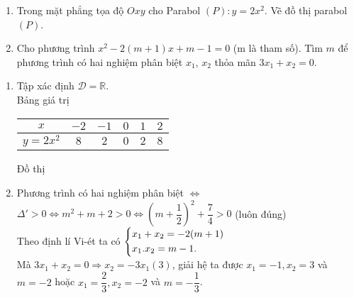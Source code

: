 \begin{ex}%
   \hfill
    \begin{enumerate}
        \item Trong mặt phẳng tọa độ $Oxy$ cho Parabol $(P):y=2x^2$. Vẽ đồ thị parabol $(P)$.
        \item Cho phương trình $x^2-2(m+1)x+m-1=0$ (m là tham số). Tìm $m$ để phương trình có hai nghiệm phân biệt $x_1$, $x_2$ thỏa mãn $3x_1+x_2=0$.
    \end{enumerate}
\loigiai
    {
    \begin{enumerate}
          \item Tập xác định $\mathscr{D} = \mathbb{R}$.\\
        Bảng giá trị \\
       \begin{center}
         \begin{tabular}{|c|c|c|c|c|c|}
        \hline 
        $x$ & $-2$ & $-1$ & $0$ & $1$ & $2$ \\ 
        \hline 
        $y = 2x^2$ & $8$ & $2$ & $0$ & $2$ & $8$ \\ 
        \hline 
        \end{tabular}
        \end{center} 
        Đồ thị 
        \begin{center}
        \end{center}
        \item Phương trình có hai nghiệm  phân biệt $\Leftrightarrow$ $\Delta'>0\Leftrightarrow m^2+m+2>0 \Leftrightarrow \left(m+\dfrac{1}{2}\right)^2+\dfrac{7}{4}>0$ (luôn đúng)\\
        Theo định lí Vi-ét ta có $\left\{\begin{aligned}&x_1+x_2=-2(m+1) \\ &x_1.x_2=m-1.\end{aligned}\right.$\\
        Mà $3x_1+x_2=0 \Rightarrow x_2=-3x_1 (3)$, giải hệ ta được $x_1=-1,x_2=3$ và $m=-2$ hoặc $x_1=\dfrac{2}{3}, x_2=-2$ và $m=-\dfrac{1}{3}$.
    \end{enumerate}
    }
\end{ex}


